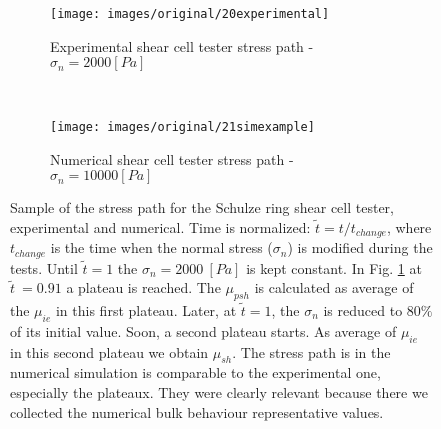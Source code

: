 \begin{figure}[htp] \centering
    \begin{subfigure}[b]{0.96\columnwidth}
        \texttt{[image: images/original/20experimental]}
        \caption{Experimental shear cell tester stress path - $\sigma_n = 2000
        [Pa]$}
        \label{fig:20experimental} 
    \end{subfigure}\\
        \begin{subfigure}[b]{0.96\columnwidth}
        \texttt{[image: images/original/21simexample]}
        \caption{Numerical shear cell tester stress path - $\sigma_n = 10000
        [Pa]$}
        \label{fig:21simexample} 
    \end{subfigure}
    \caption[Stress path]{Sample of the stress path for
	the Schulze ring shear cell tester, experimental and numerical.
	Time is normalized: $\tilde{t} = t/t_{change}$, where $t_{change}$ is the
	time when the normal stress ($\sigma_n$) is modified during the tests.
	Until $\tilde{t}=1$ the $\sigma_n = 2000 ~[Pa]$ is kept constant. 
	In Fig. \ref{fig:20experimental} at $\tilde{t}~=0.91$
 	a plateau is reached.
	The $\mu_{psh}$ is calculated as average of the $\mu_{ie}$ in this first
	plateau.
	Later, at $\tilde{t}=1$, the $\sigma_n$ is reduced to $80 \%$ of its initial
	value.
	Soon, a second plateau starts.
	As average of $\mu_{ie}$ in this second plateau we obtain $\mu_{sh}$.
	The stress path is in the numerical simulation is comparable to the
	experimental one, especially the plateaux.
	They were clearly relevant because there we collected the numerical bulk
	behaviour representative values. }
    \label{fig:40experimentalsimulation}
\end{figure}

